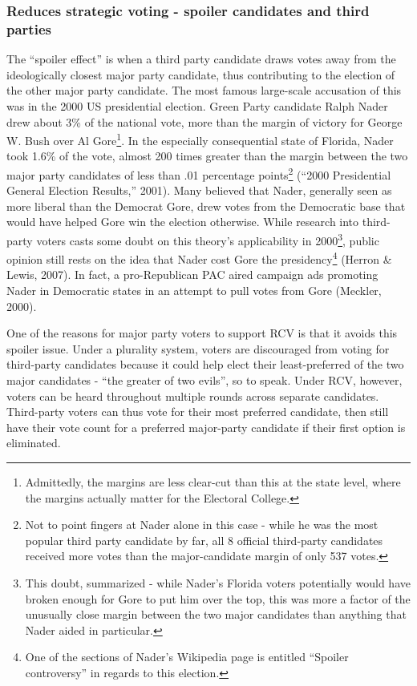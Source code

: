 \documentclass[12pt,twoside]{reedthesis}
\begin{document}
\hypertarget{reduces-strategic-voting---spoiler-candidates-and-third-parties}{%
\subsubsection{Reduces strategic voting - spoiler candidates and third parties}\label{reduces-strategic-voting---spoiler-candidates-and-third-parties}}

The ``spoiler effect'' is when a third party candidate draws votes away from the ideologically closest major party candidate, thus contributing to the election of the other major party candidate. The most famous large-scale accusation of this was in the 2000 US presidential election. Green Party candidate Ralph Nader drew about 3\% of the national vote, more than the margin of victory for George W. Bush over Al Gore\footnote{Admittedly, the margins are less clear-cut than this at the state level, where the margins actually matter for the Electoral College.}. In the especially consequential state of Florida, Nader took 1.6\% of the vote, almost 200 times greater than the margin between the two major party candidates of less than .01 percentage points\footnote{Not to point fingers at Nader alone in this case - while he was the most popular third party candidate by far, all 8 official third-party candidates received more votes than the major-candidate margin of only 537 votes.} (``2000 Presidential General Election Results,'' 2001). Many believed that Nader, generally seen as more liberal than the Democrat Gore, drew votes from the Democratic base that would have helped Gore win the election otherwise. While research into third-party voters casts some doubt on this theory's applicability in 2000\footnote{This doubt, summarized - while Nader's Florida voters potentially would have broken enough for Gore to put him over the top, this was more a factor of the unusually close margin between the two major candidates than anything that Nader aided in particular.}, public opinion still rests on the idea that Nader cost Gore the presidency\footnote{One of the sections of Nader's Wikipedia page is entitled ``Spoiler controversy'' in regards to this election.} (Herron \& Lewis, 2007). In fact, a pro-Republican PAC aired campaign ads promoting Nader in Democratic states in an attempt to pull votes from Gore (Meckler, 2000).

One of the reasons for major party voters to support RCV is that it avoids this spoiler issue. Under a plurality system, voters are discouraged from voting for third-party candidates because it could help elect their least-preferred of the two major candidates - ``the greater of two evils'', so to speak. Under RCV, however, voters can be heard throughout multiple rounds across separate candidates. Third-party voters can thus vote for their most preferred candidate, then still have their vote count for a preferred major-party candidate if their first option is eliminated.
\end{document}
